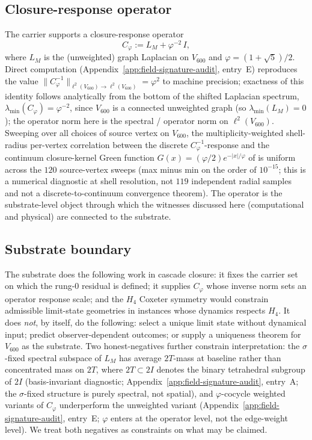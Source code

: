\documentclass[11pt]{article}
\theoremstyle{definition}
\newcommand{\pphi}{\varphi}
\newcommand{\Vsub}{V_{600}}
\newcommand{\Cphi}{C_{\pphi}}
\begin{document}
\subsection{Closure-response operator}

The carrier supports a closure-response operator
\begin{equation}\label{eq:Cphi}
   \Cphi := L_M + \pphi^{-2}\, I,
\end{equation}
where $L_M$ is the (unweighted) graph Laplacian on $\Vsub$ and
$\pphi = (1 + \sqrt{5})/2$. Direct computation
(Appendix~\ref{app:field-signature-audit}, entry~E) reproduces the
value $\|\Cphi^{-1}\|_{\ell^2(\Vsub) \to \ell^2(\Vsub)} = \pphi^2$
to machine precision; exactness of this identity follows analytically
from the bottom of the shifted Laplacian spectrum,
$\lambda_{\min}(\Cphi) = \pphi^{-2}$, since $\Vsub$ is a connected
unweighted graph (so $\lambda_{\min}(L_M) = 0$); the operator norm
here is the spectral / operator norm on $\ell^2(\Vsub)$. Sweeping over all
choices of source vertex on $\Vsub$, the multiplicity-weighted
shell-radius per-vertex correlation between the discrete
$\Cphi^{-1}$-response and the continuum closure-kernel Green function
$G(x) = (\pphi/2) e^{-|x|/\pphi}$ of \cite{AriaClosureKernel} is
uniform across the $120$ source-vertex sweeps (max minus min on the
order of $10^{-15}$; this is a numerical diagnostic at shell
resolution, not $119$ independent radial samples and not a
discrete-to-continuum convergence theorem). The operator is the substrate-level object
through which the witnesses discussed here (computational and physical)
are connected to the substrate.

\subsection{Substrate boundary}

The substrate does the following work in cascade closure: it fixes the
carrier set on which the rung-$0$ residual is defined; it supplies
$\Cphi$ whose inverse norm sets an operator response scale; and the
$H_4$ Coxeter symmetry would constrain admissible limit-state geometries
in instances whose dynamics respects $H_4$. It does \emph{not}, by itself, do the following: select a
unique limit state without dynamical input; predict observer-dependent
outcomes; or supply a uniqueness theorem for $\Vsub$ as the substrate.
Two honest-negatives further constrain interpretation: the
$\sigma$-fixed spectral subspace of $L_M$ has average $2T$-mass at
baseline rather than concentrated mass on $2T$, where $2T \subset 2I$
denotes the binary tetrahedral subgroup of $2I$ (basis-invariant
diagnostic; Appendix~\ref{app:field-signature-audit}, entry~A; the
$\sigma$-fixed structure is purely spectral, not spatial), and
$\pphi$-cocycle weighted variants of $\Cphi$ underperform the
unweighted variant (Appendix~\ref{app:field-signature-audit}, entry~E; $\pphi$
enters at the operator level, not the edge-weight level). We treat
both negatives as constraints on what may be claimed.
\end{document}
